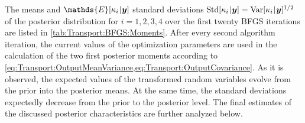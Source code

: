 The means and \(\mathds{E}[\kappa_i \cond \bm{y}]\) standard deviations \(\mathrm{Std}[\kappa_i {\:\!}|{\:\!} \bm{y}] = \mathrm{Var}[\kappa_i {\:\!}|{\:\!} \bm{y}]^{1/2}\)
of the posterior distribution for \(i = 1,2,3,4\) over the first twenty BFGS iterations are listed in \cref{tab:Transport:BFGS:Moments}.
After every second algorithm iteration, the current values of the optimization parameters are used in the calculation
of the two first posterior moments according to \cref{eq:Transport:OutputMeanVariance,eq:Transport:OutputCovariance}.
As it is observed, the expected values of the transformed random variables evolve from the prior into the posterior means.
At the same time, the standard deviations expectedly decrease from the prior to the posterior level.
The final estimates of the discussed posterior characteristics are further analyzed below.
